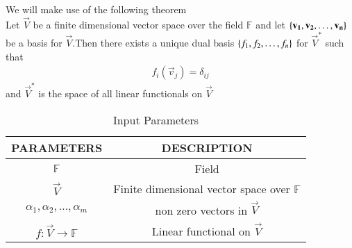 We will make use of the following theorem\\
Let $\vec{V}$ be a finite dimensional vector space over the field $\mathbb{F}$ and let $\left\{\mathbf{v_1},\mathbf{v_2},\hdots,\mathbf{v_n}\right\}$ be a basis for $\vec{V}$.Then there exists a unique dual basis $\left\{f_1,f_2,\hdots,f_n\right\}$ for $\vec{V}^*$ such that
\begin{align}
    f_i(\vec{v}_j)=\delta_{ij}\label{eq:solutions/3/5/14/1}
\end{align}
and $\vec{V}^*$ is the space of all linear functionals on $\vec{V}$
\begin{table}[!ht]
\centering
\resizebox{\columnwidth}{!}
{
\begin{tabular}{|c|c|}
\hline
\textbf{PARAMETERS}&\textbf{DESCRIPTION}\\
\hline
$\mathbb{F}$&Field\\
\hline
$\vec{V}$& Finite dimensional vector space over $\mathbb{F}$\\
\hline
$\alpha_1,\alpha_2,\hdots,\alpha_m$& non zero vectors in $\vec{V}$\\
\hline
$f:\vec{V}\rightarrow \mathbb{F}$&Linear functional on $\vec{V}$\\
\hline
\end{tabular}
}
\caption{Input Parameters}
\label{eq:table/solutions/3/5/14/0}
\end{table}

